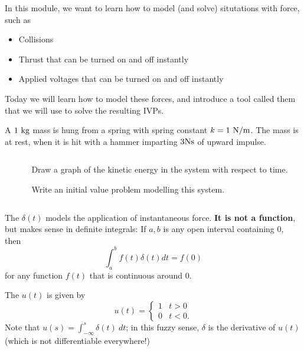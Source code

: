 \begin{applicationActivities}

\begin{observation}
In this module, we want to learn how to model (and solve) situtations with  force, such as
\begin{itemize}
	\item Collisions
	\item Thrust that can be turned on and off instantly
	\item Applied voltages that can be turned on and off instantly
\end{itemize}
\vfill
Today we will learn how to model these forces, and introduce a tool called them  that we will use to solve the resulting IVPs.
\end{observation}


\begin{activity}{10}
A \(1\ {\rm kg}\) mass is hung from a spring with spring constant \(k=1\ {\rm N/m}\).  The mass is at rest, when it is hit with a hammer imparting \(3 {\rm N s}\) of upward impulse.
\vfill
\begin{columns}
\begin{column}{0.3\textwidth}
\begin{center}
\springmass
\end{center}
\end{column}
\begin{column}{0.7\textwidth}
\begin{subactivity}
Draw a graph of the kinetic energy in the system with respect to time.
\end{subactivity}
\begin{subactivity}
Write an initial value problem modelling this system.
\end{subactivity}
\end{column}
\end{columns}
\end{activity}

\begin{definition}
The  \(\delta(t)\) models the application of instantaneous force.  \textbf{It is not a function}, but makes sense in definite integrals: 
\vfill
If \(a,b\) is any open interval containing \(0\), then
\[ \int _a ^b f(t)\delta(t)dt = f(0)\]
for any function \(f(t)\) that is continuous around \(0\).
\end{definition}

\begin{definition}
The  \(u(t)\) is given by \[u(t)=\begin{cases} 1 & t > 0 \\ 0 & t<0. \end{cases}\]
\vfill
Note that \(u(s)=\int _{-\infty} ^s  \delta(t)\ dt\); in this fuzzy sense, \(\delta\) is the derivative of \(u(t)\) (which is not differentiable everywhere!)
\end{definition}


\end{applicationActivities}
